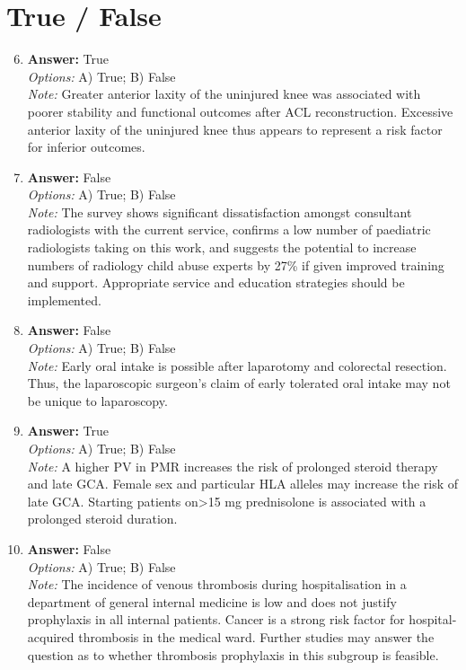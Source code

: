 \documentclass[12pt]{article}
\begin{document}
\section*{True / False}
\begin{enumerate}[label=\arabic*.]
\setcounter{enumi}{5}
\item \textbf{Answer:} True
\\ \textit{Options:} A) True; B) False
\\ \textit{Note:} Greater anterior laxity of the uninjured knee was associated with poorer stability and functional outcomes after ACL reconstruction. Excessive anterior laxity of the uninjured knee thus appears to represent a risk factor for inferior outcomes.
\item \textbf{Answer:} False
\\ \textit{Options:} A) True; B) False
\\ \textit{Note:} The survey shows significant dissatisfaction amongst consultant radiologists with the current service, confirms a low number of paediatric radiologists taking on this work, and suggests the potential to increase numbers of radiology child abuse experts by 27\% if given improved training and support. Appropriate service and education strategies should be implemented.
\item \textbf{Answer:} False
\\ \textit{Options:} A) True; B) False
\\ \textit{Note:} Early oral intake is possible after laparotomy and colorectal resection. Thus, the laparoscopic surgeon's claim of early tolerated oral intake may not be unique to laparoscopy.
\item \textbf{Answer:} True
\\ \textit{Options:} A) True; B) False
\\ \textit{Note:} A higher PV in PMR increases the risk of prolonged steroid therapy and late GCA. Female sex and particular HLA alleles may increase the risk of late GCA. Starting patients on\textgreater{}15 mg prednisolone is associated with a prolonged steroid duration.
\item \textbf{Answer:} False
\\ \textit{Options:} A) True; B) False
\\ \textit{Note:} The incidence of venous thrombosis during hospitalisation in a department of general internal medicine is low and does not justify prophylaxis in all internal patients. Cancer is a strong risk factor for hospital-acquired thrombosis in the medical ward. Further studies may answer the question as to whether thrombosis prophylaxis in this subgroup is feasible.
\end{enumerate}
\end{document}
